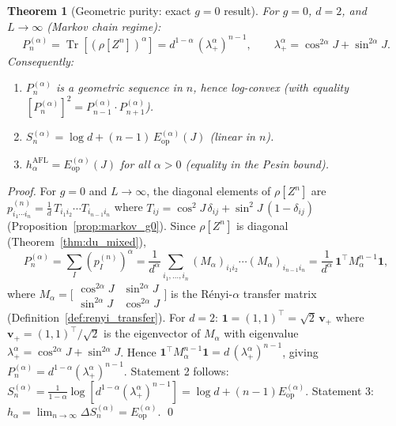 \documentclass[12pt,a4paper]{article}
\newtheorem{theorem}{Theorem}[section]
\begin{document}
\begin{theorem}[Geometric purity: exact $g=0$ result]
\label{thm:geometric_purity}
For $g=0$, $d=2$, and $L\to\infty$ (Markov chain regime):
\[
  P_n^{(\alpha)} = \operatorname{Tr}[(\rho[Z^n])^\alpha] = d^{1-\alpha}\,(\lambda_+^\alpha)^{n-1},
  \qquad
  \lambda_+^\alpha = \cos^{2\alpha}J + \sin^{2\alpha}J.
\]
Consequently:
\begin{enumerate}
\item $P_n^{(\alpha)}$ is a geometric sequence in $n$, hence log-convex (with equality $[P_n^{(\alpha)}]^2 = P_{n-1}^{(\alpha)}\cdot P_{n+1}^{(\alpha)}$).
\item $S_n^{(\alpha)} = \log d + (n-1)\,E_{\mathrm{op}}^{(\alpha)}(J)$ (linear in $n$).
\item $h_\alpha^{\mathrm{AFL}} = E_{\mathrm{op}}^{(\alpha)}(J)$ for all $\alpha>0$ (equality in the Pesin bound).
\end{enumerate}
\end{theorem}

\begin{proof}
For $g=0$ and $L\to\infty$, the diagonal elements of $\rho[Z^n]$ are
$p_{i_1\cdots i_n}^{(n)} = \frac{1}{d}\,T_{i_1 i_2}\cdots T_{i_{n-1}i_n}$
where $T_{ij}=\cos^2 J\,\delta_{ij}+\sin^2 J\,(1-\delta_{ij})$ (Proposition~\ref{prop:markov_g0}).
Since $\rho[Z^n]$ is diagonal (Theorem~\ref{thm:du_mixed}),
\[
  P_n^{(\alpha)} = \sum_{I}(p_I^{(n)})^\alpha
  = \frac{1}{d^\alpha}\sum_{i_1,\ldots,i_n}(M_\alpha)_{i_1 i_2}\cdots(M_\alpha)_{i_{n-1}i_n}
  = \frac{1}{d^\alpha}\,\mathbf{1}^\top M_\alpha^{n-1}\mathbf{1},
\]
where $M_\alpha = \bigl[\begin{smallmatrix}\cos^{2\alpha}J & \sin^{2\alpha}J\\\sin^{2\alpha}J&\cos^{2\alpha}J\end{smallmatrix}\bigr]$
is the Rényi-$\alpha$ transfer matrix (Definition~\ref{def:renyi_transfer}).
For $d=2$: $\mathbf{1}=(1,1)^\top=\sqrt{2}\,\mathbf{v}_+$ where $\mathbf{v}_+=(1,1)^\top/\sqrt{2}$ is the eigenvector of $M_\alpha$
with eigenvalue $\lambda_+^\alpha=\cos^{2\alpha}J+\sin^{2\alpha}J$.
Hence $\mathbf{1}^\top M_\alpha^{n-1}\mathbf{1} = d\,(\lambda_+^\alpha)^{n-1}$, giving $P_n^{(\alpha)}=d^{1-\alpha}(\lambda_+^\alpha)^{n-1}$.
Statement 2 follows: $S_n^{(\alpha)}=\frac{1}{1-\alpha}\log[d^{1-\alpha}(\lambda_+^\alpha)^{n-1}]=\log d+(n-1)E_{\mathrm{op}}^{(\alpha)}$.
Statement 3: $h_\alpha = \lim_{n\to\infty}\Delta S_n^{(\alpha)} = E_{\mathrm{op}}^{(\alpha)}$. \qed
\end{proof}
\end{document}

